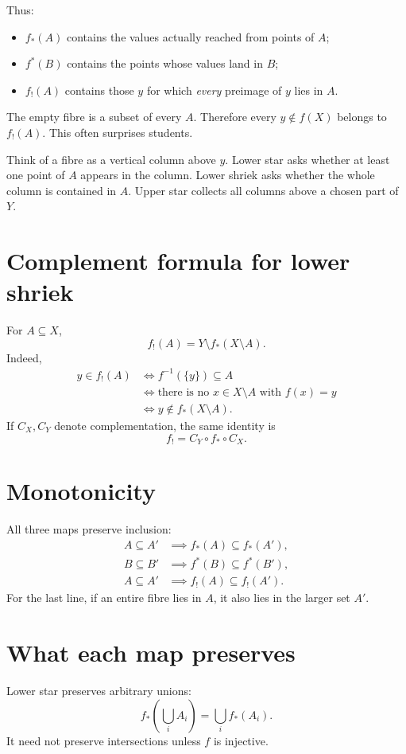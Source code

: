 \documentclass[11pt,openany]{book}
\theoremstyle{definition}
\begin{document}
Thus:
\begin{itemize}
\item $f_*(A)$ contains the values actually reached from points of $A$;
\item $f^*(B)$ contains the points whose values land in $B$;
\item $f_!(A)$ contains those $y$ for which \emph{every} preimage of $y$ lies in $A$.
\end{itemize}

The empty fibre is a subset of every $A$. Therefore every $y\notin f(X)$ belongs to $f_!(A)$. This often surprises students.

\begin{intuition}
Think of a fibre as a vertical column above $y$. Lower star asks whether at least one point of $A$ appears in the column. Lower shriek asks whether the whole column is contained in $A$. Upper star collects all columns above a chosen part of $Y$.
\end{intuition}

\section{Complement formula for lower shriek}
For $A\subseteq X$,
\[
\boxed{f_!(A)=Y\setminus f_*(X\setminus A).} \tag{15.1}
\]
Indeed,
\begin{align*}
y\in f_!(A)
&\iff f^{-1}(\{y\})\subseteq A\\
&\iff \text{there is no }x\in X\setminus A\text{ with }f(x)=y\\
&\iff y\notin f_*(X\setminus A).
\end{align*}
If $C_X,C_Y$ denote complementation, the same identity is
\[
f_!=C_Y\circ f_*\circ C_X.
\]

\section{Monotonicity}
All three maps preserve inclusion:
\begin{align*}
A\subseteq A'&\implies f_*(A)\subseteq f_*(A'),\\
B\subseteq B'&\implies f^*(B)\subseteq f^*(B'),\\
A\subseteq A'&\implies f_!(A)\subseteq f_!(A').
\end{align*}
For the last line, if an entire fibre lies in $A$, it also lies in the larger set $A'$.

\section{What each map preserves}
Lower star preserves arbitrary unions:
\[
f_*\left(\bigcup_iA_i\right)=\bigcup_i f_*(A_i).
\]
It need not preserve intersections unless $f$ is injective.
\end{document}
